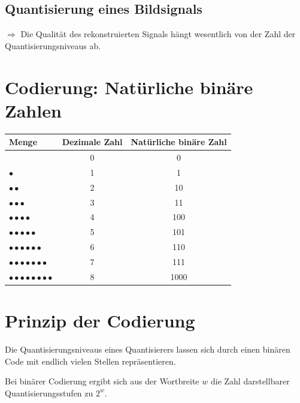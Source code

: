 \subsection*{Quantisierung eines Bildsignals}

$\Rightarrow$ Die Qualität des rekonstruierten Signals hängt wesentlich von der Zahl der Quantisierungsniveaus ab.


\section{Codierung: Natürliche binäre Zahlen}
\label{sec:codierung-binaer}

\begin{center}
\begin{tabular}{lcc}
\toprule
\textbf{Menge} & \textbf{Dezimale Zahl} & \textbf{Natürliche binäre Zahl} \\
\midrule
       & 0 & 0    \\
$\bullet$     & 1 & 1    \\
$\bullet\bullet$    & 2 & 10   \\
$\bullet\bullet\bullet$   & 3 & 11   \\
$\bullet\bullet\bullet\bullet$  & 4 & 100  \\
$\bullet\bullet\bullet\bullet\bullet$ & 5 & 101  \\
$\bullet\bullet\bullet\bullet\bullet\bullet$ & 6 & 110  \\
$\bullet\bullet\bullet\bullet\bullet\bullet\bullet$ & 7 & 111  \\
$\bullet\bullet\bullet\bullet\bullet\bullet\bullet\bullet$ & 8 & 1000 \\
\bottomrule
\end{tabular}
\end{center}

\section{Prinzip der Codierung}
\label{sec:prinzip-codierung}

Die Quantisierungsniveaus eines Quantisierers lassen sich durch einen binären Code mit endlich vielen Stellen repräsentieren.

Bei binärer Codierung ergibt sich aus der Wortbreite $w$ die Zahl darstellbarer Quantisierungsstufen zu $2^w$.

